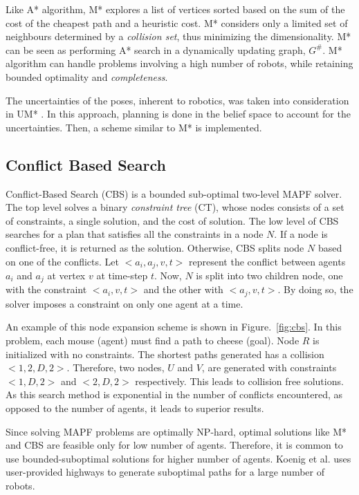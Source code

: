 Like A* algorithm, M* explores a list of vertices sorted based on the sum of the cost of the cheapest path and a heuristic cost. M* considers only a limited set of neighbours determined by a \textit{collision set}, thus minimizing the dimensionality. M* can be seen as performing A* search in a  dynamically updating graph, $G^\#$. M* algorithm can handle problems involving a high number of robots, while retaining bounded optimality and \textit{completeness}. 


The uncertainties of the poses, inherent to robotics, was taken into consideration in UM* \cite{Wagner2017PathPF}. In this approach, planning is done in the belief space to account for the uncertainties. Then, a scheme similar to M* is implemented. 
\subsection{Conflict Based Search}
Conflict-Based Search (CBS) is a bounded sub-optimal two-level MAPF solver. The top level solves a binary \textit{constraint tree} (CT), whose nodes consists of a set of constraints, a single solution, and the cost of solution. The low level of CBS searches for a plan that satisfies all the constraints in a node $N$. If a node is conflict-free, it is returned as the solution. Otherwise, CBS splits node $N$ based on one of the conflicts. Let $<a_i, a_j, v, t>$ represent the conflict between agents $a_i$ and $a_j$ at vertex $v$ at time-step $t$. Now, $N$ is split into two children node, one with the constraint $<a_i, v, t>$ and the other with $<a_j,v,t>$. By doing so, the solver imposes a constraint on only one agent at a time. 

An example of this node expansion scheme is shown in Figure.~\ref{fig:cbs}. In this problem, each mouse (agent) must find a path to cheese (goal). Node $R$ is initialized with no constraints. The shortest paths generated has a collision $<1,2,D,2>$. Therefore, two nodes, $U$ and $V$, are generated with constraints $<1,D,2>$ and $<2,D,2>$ respectively. This leads to collision free solutions. As this search method is exponential in the number of conflicts encountered, as opposed to the number of agents, it leads to superior results. 

Since solving MAPF problems are optimally NP-hard, optimal solutions like M* and CBS are feasible only for low number of agents. Therefore, it is common to use bounded-suboptimal solutions for higher number of agents. Koenig et al. \cite{cohen2016bounded} uses user-provided highways to generate suboptimal paths for a large number of robots. 

